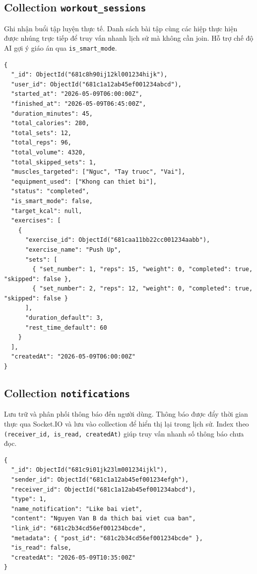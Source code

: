 \subsection{Collection \texttt{workout\_sessions}}
\label{subsec:col_workout_sessions}

Ghi nhận buổi tập luyện thực tế. Danh sách bài tập cùng các hiệp thực hiện được nhúng trực tiếp để truy vấn nhanh lịch sử mà không cần join. Hỗ trợ chế độ AI gợi ý giáo án qua \texttt{is\_smart\_mode}.

\begin{verbatim}
{
  "_id": ObjectId("681c8h90ij12kl001234hijk"),
  "user_id": ObjectId("681c1a12ab45ef001234abcd"),
  "started_at": "2026-05-09T06:00:00Z",
  "finished_at": "2026-05-09T06:45:00Z",
  "duration_minutes": 45,
  "total_calories": 280,
  "total_sets": 12,
  "total_reps": 96,
  "total_volume": 4320,
  "total_skipped_sets": 1,
  "muscles_targeted": ["Nguc", "Tay truoc", "Vai"],
  "equipment_used": ["Khong can thiet bi"],
  "status": "completed",
  "is_smart_mode": false,
  "target_kcal": null,
  "exercises": [
    {
      "exercise_id": ObjectId("681caa11bb22cc001234aabb"),
      "exercise_name": "Push Up",
      "sets": [
        { "set_number": 1, "reps": 15, "weight": 0, "completed": true, "skipped": false },
        { "set_number": 2, "reps": 12, "weight": 0, "completed": true, "skipped": false }
      ],
      "duration_default": 3,
      "rest_time_default": 60
    }
  ],
  "createdAt": "2026-05-09T06:00:00Z"
}
\end{verbatim}

\subsection{Collection \texttt{notifications}}
\label{subsec:col_notifications}

Lưu trữ và phân phối thông báo đến người dùng. Thông báo được đẩy thời gian thực qua Socket.IO và lưu vào collection để hiển thị lại trong lịch sử. Index theo \texttt{(receiver\_id, is\_read, createdAt)} giúp truy vấn nhanh số thông báo chưa đọc.

\begin{verbatim}
{
  "_id": ObjectId("681c9i01jk23lm001234ijkl"),
  "sender_id": ObjectId("681c1a12ab45ef001234efgh"),
  "receiver_id": ObjectId("681c1a12ab45ef001234abcd"),
  "type": 1,
  "name_notification": "Like bai viet",
  "content": "Nguyen Van B da thich bai viet cua ban",
  "link_id": "681c2b34cd56ef001234bcde",
  "metadata": { "post_id": "681c2b34cd56ef001234bcde" },
  "is_read": false,
  "createdAt": "2026-05-09T10:35:00Z"
}
\end{verbatim}


